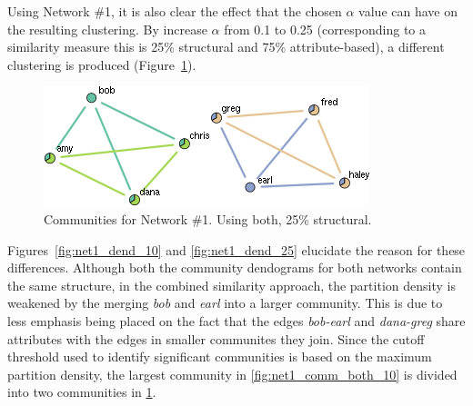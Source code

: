 \documentclass{report} %
\begin{document}
Using Network \#1, it is also clear the effect that the chosen $\alpha$ value can have on the resulting clustering. By increase $\alpha$ from 0.1 to 0.25 (corresponding to a similarity measure this is 25\% structural and 75\% attribute-based), a different clustering is produced (Figure~\ref{fig:net1_comm_both_25}).\\



\begin{figure}[htp!]
  \centering
  \includegraphics[width=0.5\linewidth]{toy2/ea/edge_comm_0.25.png}
  \caption{Communities for Network \#1. Using both, 25\% structural.}
  \label{fig:net1_comm_both_25}
\end{figure}

Figures~\ref{fig:net1_dend_10} and \ref{fig:net1_dend_25} elucidate the reason for these differences. Although both the community dendograms for both networks contain the same structure, in the combined similarity approach, the partition density is weakened by the merging \textit{bob} and \textit{earl} into a larger community. This is due to less emphasis being placed on the fact that the edges \textit{bob-earl} and \textit{dana-greg} share attributes with the edges in smaller communites they join. Since the cutoff threshold used to identify significant communities is based on the maximum partition density, the largest community in \ref{fig:net1_comm_both_10} is divided into two communities in \ref{fig:net1_comm_both_25}.\\
\end{document}
